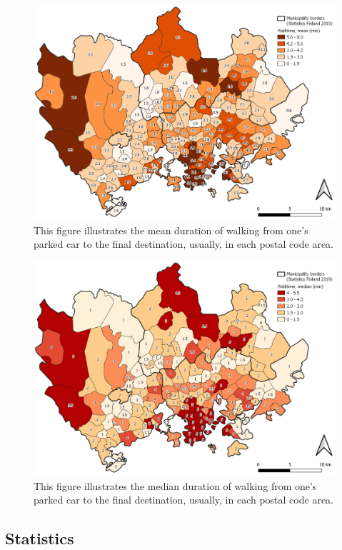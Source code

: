 \begin{figure}[H]%
    \centering
    \includegraphics[width=.88\textwidth]{images/thesis_postalvis_walkmean.png}
    \caption[Walktime, mean, in the research area]{This figure illustrates the mean duration of walking from one's parked car to the final destination, usually, in each postal code area.}%
    \label{fig:postalvis_walkmean}%
\end{figure}

\begin{figure}[H]%
    \centering
    \includegraphics[width=.88\textwidth]{images/thesis_postalvis_walkmedian.png}
    \caption[Walktime, median, in the research area]{This figure illustrates the median duration of walking from one's parked car to the final destination, usually, in each postal code area.}%
    \label{fig:postalvis_walkmedian}%
\end{figure}

\newpage
\subsection{Statistics}
\justify

